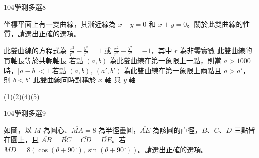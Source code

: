 \begin{QUESTIONS}
\begin{QUESTION}
\begin{QSOLLIST}
        \end{QSOLLIST}
        \begin{QEMPTYSPACE}
        \end{QEMPTYSPACE}
    \end{QUESTION}
    \begin{QUESTION}
        \begin{ExamInfo}{104}{學測}{多選}{8}
        \end{ExamInfo}
        \begin{ExamAnsRateInfo}{48}{71}{49}{24}
        \end{ExamAnsRateInfo}
        \begin{QBODY}
            坐標平面上有一雙曲線，其漸近線為 $x-y=0$ 和 $x+y=0$。關於此雙曲線的性質，請選出正確的選項。
			\begin{QOPS}
				\QOP 此雙曲線的方程式為 $\frac{{{x}^{2}}}{{{r}^{2}}}-\frac{{{y}^{2}}}{{{r}^{2}}}=1$ 或 $\frac{{{x}^{2}}}{{{r}^{2}}}-\frac{{{y}^{2}}}{{{r}^{2}}}=-1$，其中 $r$ 為非零實數
				\QOP 此雙曲線的貫軸長等於共軛軸長
				\QOP 若點 $\left( a,b \right)$ 為此雙曲線在第一象限上一點，則當 $a>1000$ 時，$\left| a-b \right|<1$
				\QOP 若點 $\left( a,b \right),\ \left( a',b' \right)$ 為此雙曲線在第一象限上兩點且 $a>a'$，則 $b<b'$
				\QOP 此雙曲線同時對稱於 $x$ 軸 與 $y$ 軸
			\end{QOPS}
        \end{QBODY}
        \begin{QFROMS}
        \end{QFROMS}
        \begin{QTAGS}\end{QTAGS}
        \begin{QANS}
            (1)(2)(4)(5)
        \end{QANS}
        \begin{QSOLLIST}
        \end{QSOLLIST}
        \begin{QEMPTYSPACE}
        \end{QEMPTYSPACE}
    \end{QUESTION}
    \begin{QUESTION}
        \begin{ExamInfo}{104}{學測}{多選}{9}
        \end{ExamInfo}
        \begin{ExamAnsRateInfo}{49}{77}{45}{25}
        \end{ExamAnsRateInfo}
        \begin{QBODY}
            如圖，以 $M$ 為圓心、$\overline{MA}=8$ 為半徑畫圓，$\overline{AE}$ 為該圓的直徑，$B$、$C$、$D$ 三點皆在圓上，且 $\overline{AB}=\overline{BC}=\overline{CD}=\overline{DE}$。若 $\lvec{MD}\,=8\left( \cos \left( \theta +90{}^\circ  \right),\sin \left( \theta +90{}^\circ  \right) \right)$。請選出正確的選項。

\end{QBODY}
\end{QUESTION}
\end{QUESTIONS}
